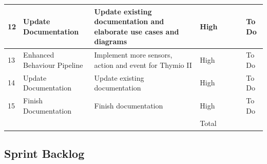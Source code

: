 \documentclass{scrartcl}
\begin{document}
\begin{table}[]
\begin{tabular}{l|l|l|l|l|l|l|l}
  \multicolumn{1}{|l|}{12} & Update Documentation & Update existing documentation and elaborate use cases and diagrams & High &  &  &  & \multicolumn{1}{l|}{To Do} \\ \hline
  \multicolumn{1}{|l|}{13} & Enhanced Behaviour Pipeline & Implement more sensors, action and event for Thymio II & High &  &  &  & \multicolumn{1}{l|}{To Do} \\ \hline
  \multicolumn{1}{|l|}{14} & Update Documentation & Update existing documentation & High &  &  &  & \multicolumn{1}{l|}{To Do} \\ \hline
  \multicolumn{1}{|l|}{15} & Finish Documentation & Finish documentation & High &  &  &  & \multicolumn{1}{l|}{To Do} \\ \hline
  \multicolumn{1}{|l|}{} &  &  & Total &  &  &  & \multicolumn{1}{l|}{} \\ \hline
  \end{tabular}
\end{table}

\subsection{Sprint Backlog}
\end{document}
